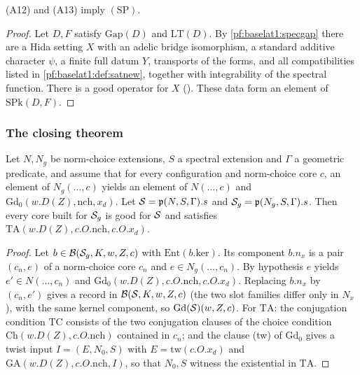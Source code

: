 \begin{proposition}\label{pf:baselat1:spack}
(A12) and (A13) imply $(\mathrm{SP})$.
\end{proposition}

\begin{proof}
Let $D,F$ satisfy $\mathrm{Gap}(D)$ and $\mathrm{LT}(D)$. By \cref{pf:baselat1:specgap} there are a Hida setting $X$ with an
adelic bridge isomorphism, a standard additive character $\psi$, a finite full datum $Y$, transports of the forms,
and all compatibilities listed in \cref{pf:baselat1:def:satnew}, together with integrability of the spectral
function. There is a good operator for $X$ (). These data form
an element of $\mathrm{SPk}(D,F)$.
\end{proof}

\subsubsection{The closing theorem}

\begin{lemma}\label{pf:baselat1:goodE}
Let $N,N_g$ be norm-choice extensions, $S$ a spectral extension and $\Gamma$ a geometric predicate, and assume that
for every configuration and norm-choice core $c$, an element of $N_g(\dots,c)$ yields an element of
$N(\dots,c)$ and $\mathrm{Gd}_0(w.D(Z),\mathrm{nch},x_d)$. Let $\mathcal S=\mathfrak{p}(N,S,\Gamma).s$
and $\mathcal S_g=\mathfrak{p}(N_g,S,\Gamma).s$. Then every core built for
$\mathcal S_g$ is good for $\mathcal S$ and satisfies $\mathrm{TA}(w.D(Z),c.O.\mathrm{nch},c.O.x_d)$.
\end{lemma}

\begin{proof}
Let $b\in\mathcal{B}(\mathcal S_g,K,w,Z,c)$ with $\mathrm{Ent}(b.\mathrm{ker})$. Its component
$b.n_x$ is a pair $(c_n,e)$ of a norm-choice core $c_n$ and $e\in N_g(\dots,c_n)$. By hypothesis $e$ yields
$e'\in N(\dots,c_n)$ and $\mathrm{Gd}_0(w.D(Z),c.O.\mathrm{nch},c.O.x_d)$. Replacing $b.n_x$ by $(c_n,e')$
gives a record in $\mathcal{B}(\mathcal S,K,w,Z,c)$ (the two slot families differ only in $N_x$), with
the same kernel component, so $\mathrm{Gd}(\mathcal S)(w,Z,c)$. For $\mathrm{TA}$: the
conjugation condition $\mathrm{TC}$ consists of the two conjugation clauses of the choice condition
$\mathrm{Ch}(w.D(Z),c.O.\mathrm{nch})$ contained in $c_n$; and the clause (tw) of $\mathrm{Gd}_0$ gives a
twist input $I=(E,N_0,S)$ with $E=\mathrm{tw}(c.O.x_d)$ and $\mathrm{GA}(w.D(Z),c.O.\mathrm{nch},I)$,
so that $N_0,S$ witness the existential in $\mathrm{TA}$.
\end{proof}

